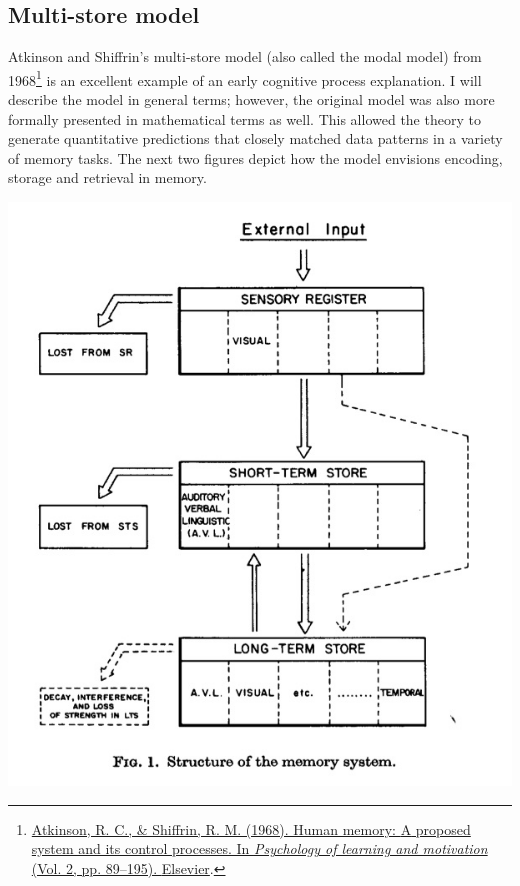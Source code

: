 \documentclass[
  oneside,
  12pt]{crumpbook}
\newenvironment{floatright50}{%
  \wrapfigure{R}{.5\textwidth}%
  }{%
  \endwrapfigure}
\begin{document}
\hypertarget{multi-store-model}{%
\subsection{Multi-store model}\label{multi-store-model}}

Atkinson and Shiffrin's multi-store model (also called the modal model) from 1968\footnote{\protect\hyperlink{ref-atkinsonHumanMemoryProposed1968}{Atkinson, R. C., \& Shiffrin, R. M. (1968). Human memory: {A} proposed system and its control processes. In \emph{Psychology of learning and motivation} (Vol. 2, pp. 89--195). {Elsevier}}.} is an excellent example of an early cognitive process explanation. I will describe the model in general terms; however, the original model was also more formally presented in mathematical terms as well. This allowed the theory to generate quantitative predictions that closely matched data patterns in a variety of memory tasks. The next two figures depict how the model envisions encoding, storage and retrieval in memory.

\begin{floatright50}
\includegraphics[width=1\linewidth]{imgs/Multi_store_1}

\end{floatright50}
\end{document}
